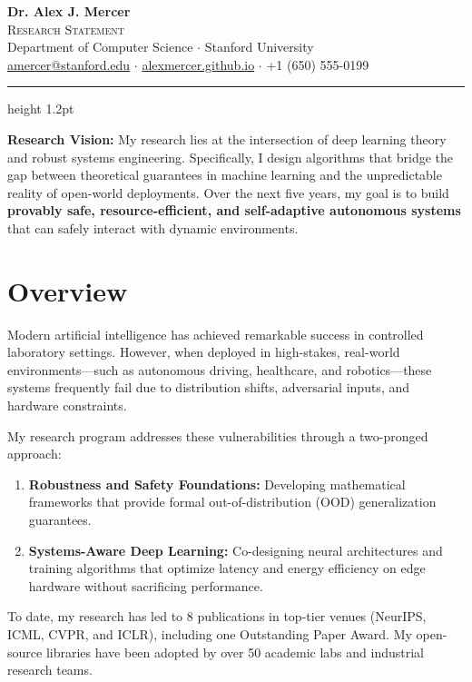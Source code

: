 \documentclass[10pt,a4paper]{article}
\begin{document}
\begin{center}
  {\fontsize{24pt}{28pt}\selectfont\color{accent}\bfseries Dr. Alex J. Mercer} \\
  \vspace{0.2em}
  {\fontsize{13pt}{16pt}\selectfont\scshape Research Statement} \\
  \vspace{0.4em}
  {\small \color{textgray} 
    Department of Computer Science $\cdot$ Stanford University \\
    \href{mailto:amercer@stanford.edu}{amercer@stanford.edu} $\cdot$ \href{https://alexmercer.github.io}{alexmercer.github.io} $\cdot$ +1 (650) 555-0199
  } \\
  \vspace{0.6em}
  \color{accent}\hrule height 1.2pt
\end{center}

\vspace{0.2em}

\begin{summarybox}
  \noindent\textbf{Research Vision:} My research lies at the intersection of deep learning theory and robust systems engineering. Specifically, I design algorithms that bridge the gap between theoretical guarantees in machine learning and the unpredictable reality of open-world deployments. Over the next five years, my goal is to build \textbf{provably safe, resource-efficient, and self-adaptive autonomous systems} that can safely interact with dynamic environments.
\end{summarybox}

\section{Overview}
Modern artificial intelligence has achieved remarkable success in controlled laboratory settings. However, when deployed in high-stakes, real-world environments---such as autonomous driving, healthcare, and robotics---these systems frequently fail due to distribution shifts, adversarial inputs, and hardware constraints. 

My research program addresses these vulnerabilities through a two-pronged approach:
\begin{enumerate}
  \item \textbf{Robustness and Safety Foundations:} Developing mathematical frameworks that provide formal out-of-distribution (OOD) generalization guarantees.
  \item \textbf{Systems-Aware Deep Learning:} Co-designing neural architectures and training algorithms that optimize latency and energy efficiency on edge hardware without sacrificing performance.
\end{enumerate}
To date, my research has led to 8 publications in top-tier venues (NeurIPS, ICML, CVPR, and ICLR), including one Outstanding Paper Award. My open-source libraries have been adopted by over 50 academic labs and industrial research teams.
\end{document}
